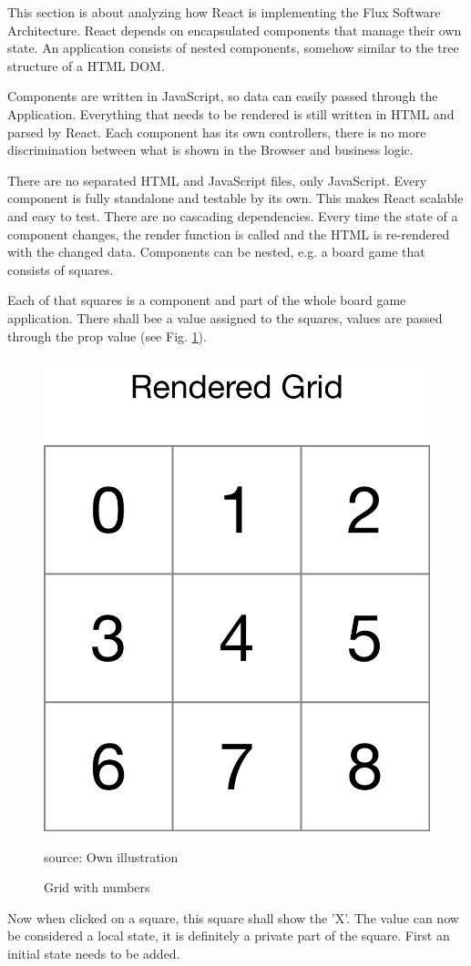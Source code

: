 This section is about analyzing how React is implementing the Flux Software Architecture. React depends on encapsulated components that manage their own state. An application consists of nested components, somehow similar to the tree structure of a HTML DOM.

Components are written in JavaScript, so data can easily passed through the Application. Everything that needs to be rendered is still written in HTML and parsed by React. Each component has its own controllers, there is no more discrimination between what is shown in the Browser and business logic.

There are no separated HTML and JavaScript files, only JavaScript. Every component is fully standalone and testable by its own. This makes React scalable and easy to test. There are no cascading dependencies. Every time the state of a component changes, the render function is called and the HTML is re-rendered with the changed data. Components can be nested, e.g. a board game that consists of squares.




Each of that squares is a component and part of the whole board game application. There shall bee a value assigned to the squares, values are passed through the prop value (see Fig. \ref{fig:Grid}).




\begin{figure}[H]
	\centering
	\includegraphics[width=0.3\linewidth]{bilder/grundlagen/GameGrid.png}
	\caption{Grid with numbers} source: Own illustration
	\label{fig:Grid}
\end{figure}

Now when clicked on a square, this square shall show the 'X'. The value can now be considered a local state, it is definitely a private part of the square. First an initial state needs to be added.



